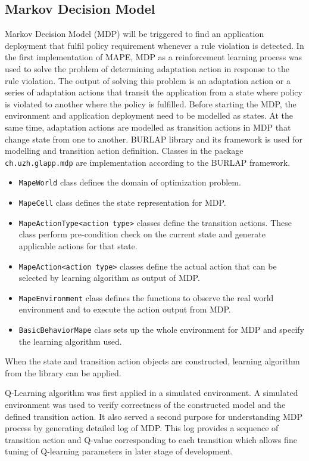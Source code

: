 \documentclass{seal_thesis}
\begin{document}
\subsection{Markov Decision Model}
Markov Decision Model (MDP) will be triggered to find an application deployment that fulfil policy requirement whenever a rule violation is detected.
In the first implementation of MAPE, MDP as a reinforcement learning process was used to solve the problem of determining adaptation action in response to the rule violation.
The output of solving this problem is an adaptation action or a series of adaptation actions that transit the application from a state where policy is violated to another where the policy is fulfilled.
Before starting the MDP, the environment and application deployment need to be modelled as states.
At the same time, adaptation actions are modelled as transition actions in MDP that change state from one to another.
BURLAP library and its framework is used for modelling and transition action definition.
Classes in the package \texttt{ch.uzh.glapp.mdp} are implementation according to the BURLAP framework. 
\begin{itemize}
\item \texttt{MapeWorld} class defines the domain of optimization problem.
\item \texttt{MapeCell} class defines the state representation for MDP.
\item \texttt{MapeActionType<action type>} classes define the transition actions.
These class perform pre-condition check on the current state and generate applicable actions for that state.
\item \texttt{MapeAction<action type>} classes define the actual action that can be selected by learning algorithm as output of MDP.
\item \texttt{MapeEnvironment} class defines the functions to observe the real world environment and to execute the action output from MDP.
\item \texttt{BasicBehaviorMape} class sets up the whole environment for MDP and specify the learning algorithm used.
\end{itemize}
When the state and transition action objects are constructed, learning algorithm from the library can be applied.

Q-Learning algorithm was first applied in a simulated environment.
A simulated environment was used to verify correctness of the constructed model and the defined transition action.
It also served a second purpose for understanding MDP process by generating detailed log of MDP.
This log provides a sequence of transition action and Q-value corresponding to each transition which allows fine tuning of Q-learning parameters in later stage of development.
\end{document}
